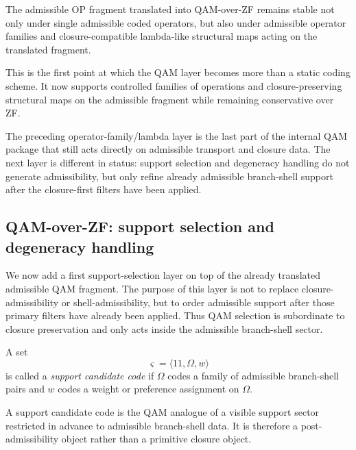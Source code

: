 \begin{corollary}
The admissible OP fragment translated into QAM-over-ZF remains stable not only under single admissible coded operators, but also under admissible operator families and closure-compatible lambda-like structural maps acting on the translated fragment.
\end{corollary}

\begin{remark}
This is the first point at which the QAM layer becomes more than a static coding scheme. It now supports controlled families of operations and closure-preserving structural maps on the admissible fragment while remaining conservative over ZF.
\end{remark}

\begin{remark}
The preceding operator-family/lambda layer is the last part of the internal QAM package that still acts directly on admissible transport and closure data. The next layer is different in status: support selection and degeneracy handling do not generate admissibility, but only refine already admissible branch-shell support after the closure-first filters have been applied.
\end{remark}

\subsection{QAM-over-ZF: support selection and degeneracy handling}

We now add a first support-selection layer on top of the already translated admissible QAM fragment. The purpose of this layer is not to replace closure-admissibility or shell-admissibility, but to order admissible support after those primary filters have already been applied. Thus QAM selection is subordinate to closure preservation and only acts inside the admissible branch-shell sector.

\begin{definition}
A set
\[
\varsigma = \langle 11,\Omega,w\rangle
\]
is called a \emph{support candidate code} if $\Omega$ codes a family of admissible branch-shell pairs and $w$ codes a weight or preference assignment on $\Omega$.
\end{definition}

\begin{remark}
A support candidate code is the QAM analogue of a visible support sector restricted in advance to admissible branch-shell data. It is therefore a post-admissibility object rather than a primitive closure object.
\end{remark}

